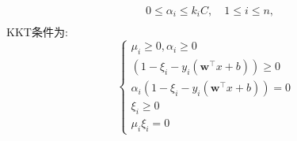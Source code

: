 \documentclass[answers]{exam}  %
\begin{document}
\begin{enumerate}[label=\alph*.]
\begin{align*}
                    & 0 \leq \alpha_i \leq k_i C,\quad 1\leq i\leq n,\\
    \end{align*}
    KKT条件为:
    \begin{equation*}
        \begin{cases*}
            \mu_i \geq 0, \alpha_i \geq 0\\
            (1 - \xi_i - y_i(\mathbf{w}^\top x + b)) \geq 0 \\
            \alpha_i (1 - \xi_i - y_i(\mathbf{w}^\top x + b)) = 0\\
            \xi_i \geq 0 \\
            \mu_i \xi_i = 0
        \end{cases*}
    \end{equation*}
\end{enumerate}
\end{document}
